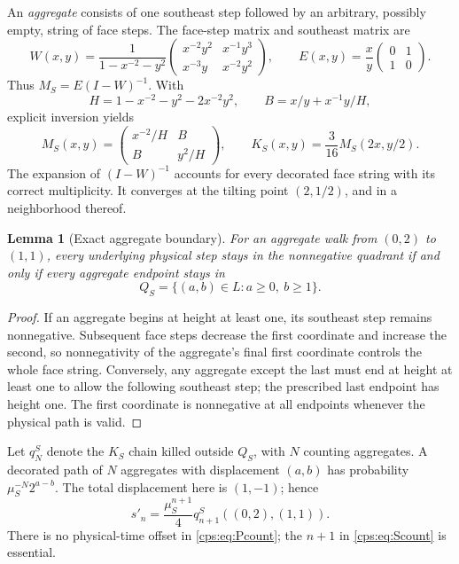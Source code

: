 \documentclass[11pt,letterpaper]{article}
\numberwithin{equation}{section}
\newtheorem{lemma}[theorem]{Lemma}
\theoremstyle{remark}\newtheorem{remark}[theorem]{Remark}
\begin{document}
An \emph{aggregate} consists of one southeast step followed by an arbitrary, possibly empty, string of face steps. The face-step matrix and southeast matrix are
\begin{equation}
 W(x,y)=\frac1{1-x^{-2}-y^2}
 \begin{pmatrix}x^{-2}y^2&x^{-1}y^3\\x^{-3}y&x^{-2}y^2\end{pmatrix},
 \qquad E(x,y)=\frac{x}{y}\begin{pmatrix}0&1\\1&0\end{pmatrix}.
\end{equation}
Thus $M_S=E(I-W)^{-1}$. With
\begin{equation}
 H=1-x^{-2}-y^2-2x^{-2}y^2,\qquad B=x/y+x^{-1}y/H,
\end{equation}
explicit inversion yields
\begin{equation}\label{cps:eq:SM}
 M_S(x,y)=\begin{pmatrix}x^{-2}/H&B\\B&y^2/H\end{pmatrix},\qquad
 K_S(x,y)=\frac3{16}M_S(2x,y/2).
\end{equation}
The expansion of $(I-W)^{-1}$ accounts for every decorated face string with its correct multiplicity. It converges at the tilting point $(2,1/2)$, and in a neighborhood thereof.

\begin{lemma}[Exact aggregate boundary]\label{cps:lem:Sboundary}
For an aggregate walk from $(0,2)$ to $(1,1)$, every underlying physical step stays in the nonnegative quadrant if and only if every aggregate endpoint stays in
\begin{equation}\label{cps:eq:SQ}
 Q_S=\{(a,b)\in L:a\ge0,\ b\ge1\}.
\end{equation}
\end{lemma}
\begin{proof}
If an aggregate begins at height at least one, its southeast step remains nonnegative. Subsequent face steps decrease the first coordinate and increase the second, so nonnegativity of the aggregate's final first coordinate controls the whole face string. Conversely, any aggregate except the last must end at height at least one to allow the following southeast step; the prescribed last endpoint has height one. The first coordinate is nonnegative at all endpoints whenever the physical path is valid.
\end{proof}
Let $q_N^S$ denote the $K_S$ chain killed outside $Q_S$, with $N$ counting aggregates. A decorated path of $N$ aggregates with displacement $(a,b)$ has probability $\mu_S^{-N}2^{a-b}$. The total displacement here is $(1,-1)$; hence
\begin{equation}\label{cps:eq:Scount}
 s'_n=\frac{\mu_S^{n+1}}4q_{n+1}^S((0,2),(1,1)).
\end{equation}
There is no physical-time offset in \eqref{cps:eq:Pcount}; the $n+1$ in \eqref{cps:eq:Scount} is essential.
\end{document}
